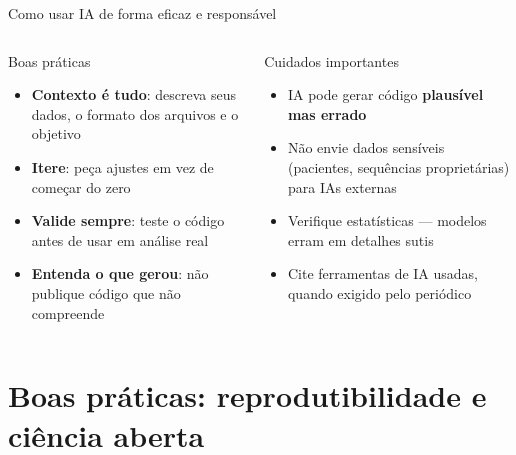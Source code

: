 \begin{frame}{Como usar IA de forma eficaz e responsável}
\begin{columns}
\begin{block}{Boas práticas}
\begin{itemize}
    \item \textbf{Contexto é tudo}: descreva seus dados, o formato dos arquivos e o objetivo
    \item \textbf{Itere}: peça ajustes em vez de começar do zero
    \item \textbf{Valide sempre}: teste o código antes de usar em análise real
    \item \textbf{Entenda o que gerou}: não publique código que não compreende
\end{itemize}
\end{block}

\begin{alertblock}{Cuidados importantes}
\begin{itemize}
    \item IA pode gerar código \textbf{plausível mas errado}
    \item Não envie dados sensíveis (pacientes, sequências proprietárias) para IAs externas
    \item Verifique estatísticas — modelos erram em detalhes sutis
    \item Cite ferramentas de IA usadas, quando exigido pelo periódico
\end{itemize}
\end{alertblock}
\end{columns}
\end{frame}

\section{Boas práticas: reprodutibilidade e ciência aberta}

